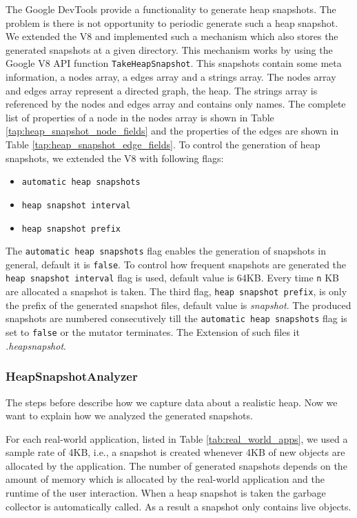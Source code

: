 The Google DevTools \cite{DevTools} provide a functionality to generate heap snapshots. The problem is there is not opportunity to periodic generate such a heap snapshot. We extended the V8 and implemented such a mechanism which also stores the generated snapshots at a given directory. This mechanism works by using the Google V8 API function \texttt{TakeHeapSnapshot}. This snapshots contain some meta information, a nodes array, a edges array and a strings array. The nodes array and edges array represent a directed graph, the heap. The strings array is referenced by the nodes and edges array and contains only names. The complete list of properties of a node in the nodes array is shown in Table \ref{tap:heap_snapshot_node_fields} and the properties of the edges are shown in Table \ref{tap:heap_snapshot_edge_fields}. To control the generation of heap snapshots, we extended the V8 with following flags:
\begin{itemize}
	\item \texttt{automatic heap snapshots}
	\item \texttt{heap snapshot interval}
	\item \texttt{heap snapshot prefix} 
\end{itemize}	
The \texttt{automatic heap snapshots} flag enables the generation of snapshots in general, default it is \texttt{false}. To control how frequent snapshots are generated the \texttt{heap snapshot interval} flag is used, default value is 64KB. Every time \texttt{n} KB are allocated a snapshot is taken. The third flag, \texttt{heap snapshot prefix}, is only the prefix of the generated snapshot files, default value is \textit{snapshot}. The produced snapshots are numbered consecutively till the \texttt{automatic heap snapshots} flag is set to \texttt{false} or the mutator terminates. The Extension of such files it \textit{.heapsnapshot}. 

\subsubsection{HeapSnapshotAnalyzer} \label{sec:heap_snapshot_analyzer}
The steps before describe how we capture data about a realistic \JS heap. Now we want to explain how we analyzed the generated snapshots. 

For each real-world application, listed in Table \ref{tab:real_world_apps}, we used a sample rate of 4KB, i.e., a snapshot is created whenever 4KB of new objects are allocated by the application. The number of generated snapshots depends on the amount of memory which is allocated by the real-world application and the runtime of the user interaction. When a heap snapshot is taken the garbage collector is automatically called. As a result a snapshot only contains live objects. 

